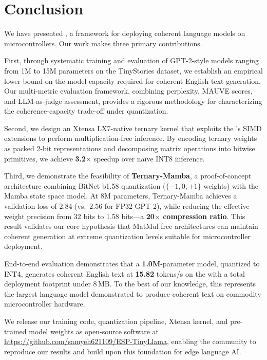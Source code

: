 \section{Conclusion}
\label{sec:conclusion}

We have presented \tinybit{}, a framework for deploying coherent language
models on microcontrollers. Our work makes three primary contributions.

First, through systematic training and evaluation of GPT-2-style models
ranging from 1M to 15M parameters on the TinyStories dataset, we establish
an empirical lower bound on the model capacity required for coherent English
text generation. Our multi-metric evaluation framework, combining perplexity,
MAUVE scores, and LLM-as-judge assessment, provides a rigorous methodology
for characterizing the coherence-capacity trade-off under quantization.

Second, we design an Xtensa LX7-native ternary \gemv{} kernel that exploits
the \espss{}'s SIMD extensions to perform multiplication-free inference. By
encoding ternary weights as packed 2-bit representations and decomposing
matrix operations into bitwise primitives, we achieve \textbf{3.2$\times$}
speedup over na\"ive INT8 inference.

Third, we demonstrate the feasibility of \textbf{Ternary-Mamba}, a proof-of-concept
architecture combining BitNet b1.58 quantization ($\{-1, 0, +1\}$ weights) with the
Mamba state space model. At 8M parameters, Ternary-Mamba achieves a validation
loss of 2.84 (vs.\ 2.56 for FP32 GPT-2), while reducing the effective weight
precision from 32 bits to 1.58 bits---a \textbf{20$\times$ compression ratio}. This
result validates our core hypothesis that MatMul-free architectures can maintain
coherent generation at extreme quantization levels suitable for microcontroller deployment.

End-to-end evaluation demonstrates that a \textbf{1.0M}-parameter model,
quantized to INT4, generates coherent English text at
\textbf{15.82} tokens/s on the \espss{} with a total deployment footprint under
8\,MB. To the best of our knowledge, this represents the largest language
model demonstrated to produce coherent text on commodity microcontroller
hardware.

We release our training code, quantization pipeline, Xtensa kernel, and
pre-trained model weights as open-source software at
\url{https://github.com/samyeh621109/ESP-TinyLlama}, enabling the community
to reproduce our results and build upon this foundation for edge language AI.
